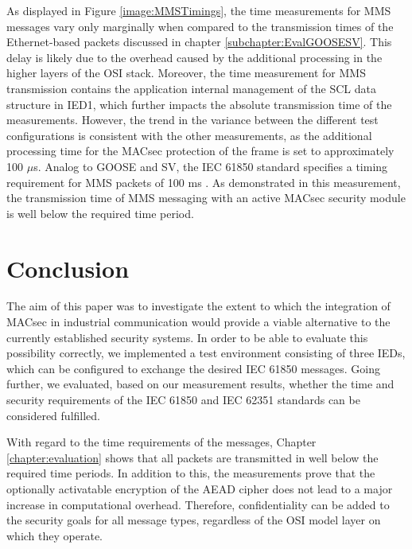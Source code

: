 \documentclass[conference, onecolumn, a4paper]{IEEEtran}
\begin{document}
\noindent As displayed in Figure \ref{image:MMSTimings}, the time measurements for MMS messages vary only marginally when compared to the transmission 
times of the Ethernet-based packets discussed in chapter \ref{subchapter:EvalGOOSESV}. This delay is likely due to the overhead caused by the additional 
processing in the higher layers of the OSI stack. Moreover, the time measurement for MMS transmission contains the application internal management of 
the SCL data structure in IED1, which further impacts the absolute transmission time of the measurements. However, the trend in the variance between 
the different test configurations is consistent with the other measurements, as the additional processing time for the MACsec protection of the frame 
is set to approximately 100 $\mu$s. Analog to GOOSE and SV, the IEC 61850 standard specifies a timing requirement for MMS packets of 100 ms 
\cite{fixedLatencyGOOSESV:2021}. As demonstrated in this measurement, the transmission time of MMS messaging with an active MACsec security module is 
well below the required time period. 

\section{Conclusion}
\label{chapter:conclusion}
\noindent The aim of this paper was to investigate the extent to which the integration of MACsec in industrial communication would provide a viable 
alternative to the currently established security systems. In order to be able to evaluate this possibility correctly, we implemented a test environment  
consisting of three IEDs, which can be configured to exchange the desired IEC 61850 messages. Going further, we evaluated, based on 
our measurement results, whether the time and security requirements of the IEC 61850 and IEC 62351 standards can be considered fulfilled.  

\smallskip
With regard to the time requirements of the messages, Chapter \ref{chapter:evaluation} shows that all packets are transmitted in well below the required 
time periods. In addition to this, the measurements prove that the optionally activatable encryption of the AEAD cipher does not lead to a major increase 
in computational overhead. Therefore, confidentiality can be added to the security goals for all message types, regardless of the OSI model layer on which 
they operate. 
\end{document}

